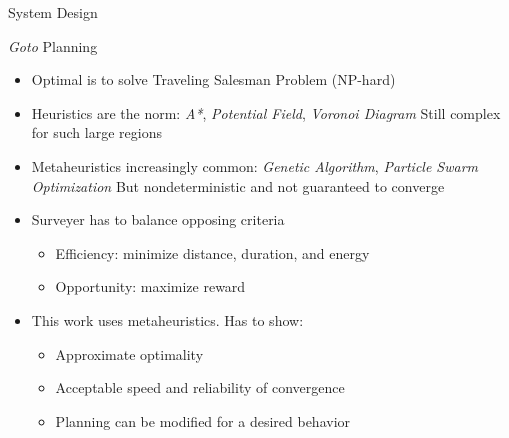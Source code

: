 \documentclass[9pt]{beamer}
\begin{document}
\begin{frame}{System Design}
    \begin{block}{\textit{Goto} Planning}
        \begin{itemize}
	        \item Optimal is to solve Traveling Salesman Problem (NP-hard)
    	    \item Heuristics are the norm: \textit{A*}, \textit{Potential Field}, \textit{Voronoi Diagram} \newline Still complex for such large regions
            \item Metaheuristics increasingly common: \textit{Genetic Algorithm}, \textit{Particle Swarm Optimization} \newline But nondeterministic and not guaranteed to converge
	        \item Surveyer has to balance opposing criteria
	        \begin{itemize}
	            \item Efficiency: minimize distance, duration, and energy
	            \item Opportunity: maximize reward
	        \end{itemize}
	        \item This work uses metaheuristics. Has to show: 
	        \begin{itemize}
	            \item Approximate optimality
	            \item Acceptable speed and reliability of convergence
	            \item Planning can be modified for a desired behavior
	        \end{itemize}
        \end{itemize}
    \end{block}
\end{frame}
\end{document}
